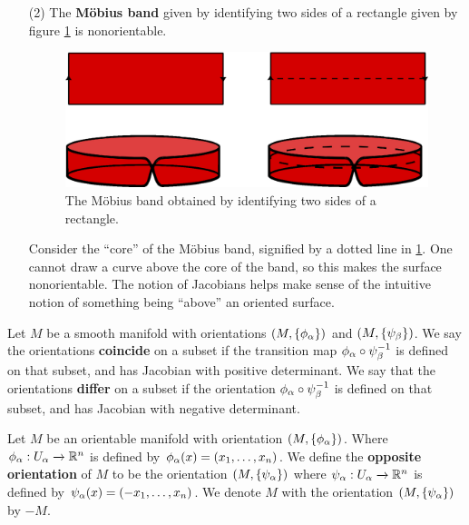 \begin{example}
\begin{enumerate}
        \item[(2)] The \textbf{M\"obius band} given by identifying two sides of
            a rectangle given by figure \ref{figure_1.6} is nonorientable.
            \begin{figure}[h]
                \centering
                \includegraphics[scale=0.5]{Figures/Chapter1/mobius_band.eps}
                \caption{The M\"obius band obtained by identifying two sides of
                a rectangle.}
                \label{figure_1.6}
            \end{figure}
            Consider the ``core'' of the M\"obius band, signified by a dotted
            line in \ref{figure_1.6}. One cannot draw a curve above the core of
            the band, so this makes the surface nonorientable. The notion of
            Jacobians helps make sense of the intuitive notion of something
            being ``above'' an oriented surface.
    \end{enumerate}
\end{example}

\begin{definition}
    Let $M$ be a smooth manifold with orientations $(M,\{\phi_\alpha\})$ and
    $(M,\{\psi_\beta\})$. We say the orientations \textbf{coincide} on a subset
    if the transition map $\phi_\alpha \circ \psi_\beta^{-1}$ is defined on that
    subset, and has Jacobian with positive determinant. We say that the
    orientations \textbf{differ} on a subset if the orientation $\phi_\alpha \circ
    \psi_\beta^{-1}$ is defined on that subset, and has Jacobian with negative
    determinant.
\end{definition}

\begin{definition}
    Let $M$ be an orientable manifold with orientation $(M,\{\phi_\alpha\})$. Where
    $\phi_\alpha:U_\alpha \xrightarrow{} \mathbb{R}^n$ is defined by $\phi_\alpha(x)=(x_1, \dots,
    x_n)$. We define the \textbf{opposite orientation} of $M$ to be the
    orientation $(M,\{\psi_\alpha\})$ where $\psi_\alpha:U_\alpha \xrightarrow{} \mathbb{R}^n$ is
    defined by $\psi_\alpha(x)=(-x_1, \dots, x_n)$. We denote $M$ with the
    orientation $(M,\{\psi_\alpha\})$ by $-M$.
\end{definition}

